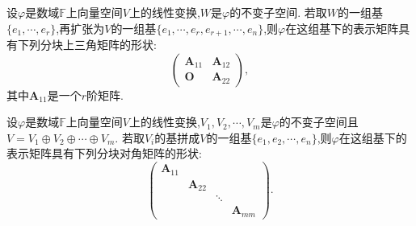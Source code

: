 \documentclass[lang=cn,newtx,10pt,scheme=chinese]{elegantbook}
\begin{document}
\begin{theorem}\label{theorem:在不变子空间基下的矩阵}
设\(\varphi\)是数域\(\mathbb{F}\)上向量空间\(V\)上的线性变换,\(W\)是\(\varphi\)的不变子空间. 若取\(W\)的一组基\(\{e_1,\cdots,e_r\}\),再扩张为\(V\)的一组基\(\{e_1,\cdots,e_r,e_{r + 1},\cdots,e_n\}\),则\(\varphi\)在这组基下的表示矩阵具有下列分块上三角矩阵的形状:
\[
\begin{pmatrix}
\boldsymbol{A}_{11}&\boldsymbol{A}_{12}\\
\boldsymbol{O}&\boldsymbol{A}_{22}
\end{pmatrix},
\]
其中\(\boldsymbol{A}_{11}\)是一个\(r\)阶矩阵.
\end{theorem}

\begin{theorem}\label{theorem:在直和的基下的矩阵}
设\(\varphi\)是数域\(\mathbb{F}\)上向量空间\(V\)上的线性变换,\(V_1,V_2,\cdots,V_m\)是\(\varphi\)的不变子空间且\(V = V_1\oplus V_2\oplus\cdots\oplus V_m\). 若取\(V_i\)的基拼成\(V\)的一组基\(\{e_1,e_2,\cdots,e_n\}\),则\(\varphi\)在这组基下的表示矩阵具有下列分块对角矩阵的形状:
\[
\begin{pmatrix}
\boldsymbol{A}_{11}&&&\\
&\boldsymbol{A}_{22}&&\\
&&\ddots&\\
&&&\boldsymbol{A}_{mm}
\end{pmatrix}.
\]
\end{theorem}
\end{document}
